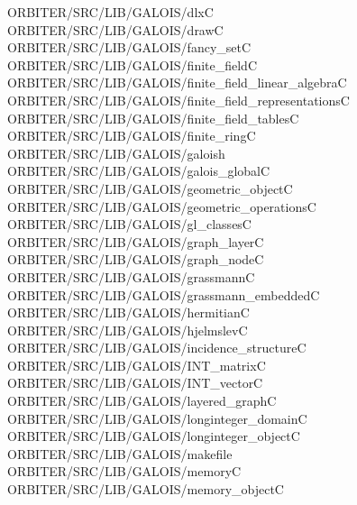 \begin{tabbing}
ORBITER/SRC/LIB/GALOIS/dlxC\\[0pt]
ORBITER/SRC/LIB/GALOIS/drawC\\[0pt]
ORBITER/SRC/LIB/GALOIS/fancy\_setC\\[0pt]
ORBITER/SRC/LIB/GALOIS/finite\_fieldC\\[0pt]
ORBITER/SRC/LIB/GALOIS/finite\_field\_linear\_algebraC\\[0pt]
ORBITER/SRC/LIB/GALOIS/finite\_field\_representationsC\\[0pt]
ORBITER/SRC/LIB/GALOIS/finite\_field\_tablesC\\[0pt]
ORBITER/SRC/LIB/GALOIS/finite\_ringC\\[0pt]
ORBITER/SRC/LIB/GALOIS/galoish\\[0pt]
ORBITER/SRC/LIB/GALOIS/galois\_globalC\\[0pt]
ORBITER/SRC/LIB/GALOIS/geometric\_objectC\\[0pt]
ORBITER/SRC/LIB/GALOIS/geometric\_operationsC\\[0pt]
ORBITER/SRC/LIB/GALOIS/gl\_classesC\\[0pt]
ORBITER/SRC/LIB/GALOIS/graph\_layerC\\[0pt]
ORBITER/SRC/LIB/GALOIS/graph\_nodeC\\[0pt]
ORBITER/SRC/LIB/GALOIS/grassmannC\\[0pt]
ORBITER/SRC/LIB/GALOIS/grassmann\_embeddedC\\[0pt]
ORBITER/SRC/LIB/GALOIS/hermitianC\\[0pt]
ORBITER/SRC/LIB/GALOIS/hjelmslevC\\[0pt]
ORBITER/SRC/LIB/GALOIS/incidence\_structureC\\[0pt]
ORBITER/SRC/LIB/GALOIS/INT\_matrixC\\[0pt]
ORBITER/SRC/LIB/GALOIS/INT\_vectorC\\[0pt]
ORBITER/SRC/LIB/GALOIS/layered\_graphC\\[0pt]
ORBITER/SRC/LIB/GALOIS/longinteger\_domainC\\[0pt]
ORBITER/SRC/LIB/GALOIS/longinteger\_objectC\\[0pt]
ORBITER/SRC/LIB/GALOIS/makefile\\[0pt]
ORBITER/SRC/LIB/GALOIS/memoryC\\[0pt]
ORBITER/SRC/LIB/GALOIS/memory\_objectC\\[0pt]

\end{tabbing}
